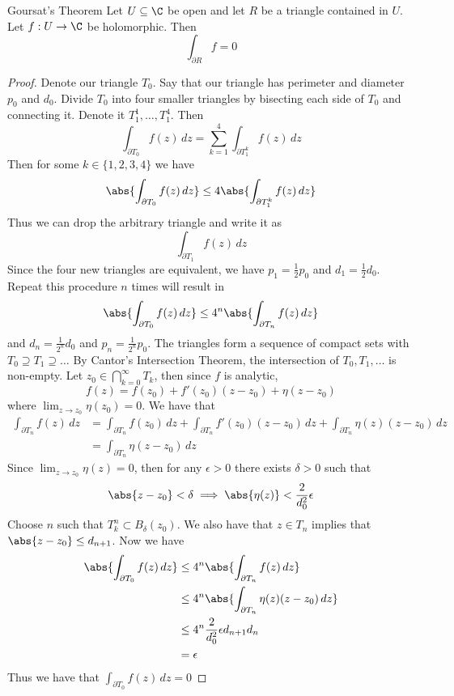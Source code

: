\documentclass[a4paper]{article}
\begin{document}
\begin{thm}{Goursat's Theorem}{} Let $U\subseteq\C$ be open and let $R$ be a triangle contained in $U$. Let $f:U\to\C$ be holomorphic. Then $$\int_{\partial R}f=0$$ \tcbline
\begin{proof} Denote our triangle $T_0$. Say that our triangle has perimeter and diameter $p_0$ and $d_0$. Divide $T_0$ into four smaller triangles by bisecting each side of $T_0$ and connecting it. Denote it $T_1^1,\dots,T_1^4$. Then $$\int_{\partial T_0}f(z)\,dz=\sum_{k=1}^4\int_{\partial T_1^k}f(z)\,dz$$ Then for some $k\in\{1,2,3,4\}$ we have $$\abs{\int_{\partial T_0}f(z)\,dz}\leq 4\abs{\int_{\partial T_1^k}f(z)\,dz}$$ Thus we can drop the arbitrary triangle and write it as $$\int_{\partial T_1}f(z)\,dz$$ Since the four new triangles are equivalent, we have $p_1=\frac{1}{2}p_0$ and $d_1=\frac{1}{2}d_0$. Repeat this procedure $n$ times will result in $$\abs{\int_{\partial T_0}f(z)\,dz}\leq 4^n\abs{\int_{\partial T_n}f(z)\,dz}$$ and $d_n=\frac{1}{2^n}d_0$ and $p_n=\frac{1}{2^n}p_0$. The triangles form a sequence of compact sets with $T_0\supseteq T_1\supseteq\dots$ By Cantor's Intersection Theorem, the intersection of $T_0,T_1,\dots$ is non-empty. Let $z_0\in\bigcap_{k=0}^\infty T_k$, then since $f$ is analytic, $$f(z)=f(z_0)+f'(z_0)(z-z_0)+\eta(z-z_0)$$ where $\lim_{z\to z_0}\eta(z_0)=0$. We have that
\begin{align*}
\int_{\partial T_n}f(z)\,dz&=\int_{\partial T_n}f(z_0)\,dz+\int_{\partial T_n}f'(z_0)(z-z_0)\,dz+\int_{\partial T_n}\eta(z)(z-z_0)\,dz\\
&=\int_{\partial T_n}\eta(z-z_0)\,dz
\end{align*} Since $\lim_{z\to z_0}\eta(z)=0$, then for any $\epsilon>0$ there exists $\delta>0$ such that $$\abs{z-z_0}<\delta\implies\abs{\eta(z)}<\frac{2}{d_0^2}\epsilon$$ Choose $n$ such that $T_k^n\subset B_\delta(z_0)$. We also have that $z\in T_n$ implies that $\abs{z-z_0}\leq d_{n+1}$. Now we have
\begin{align*}
\abs{\int_{\partial T_0}f(z)\,dz}&\leq4^n\abs{\int_{\partial T_n}f(z)\,dz}\\
&\leq4^n\abs{\int_{\partial T_n}\eta(z)(z-z_0)\,dz}\\
&\leq4^n\frac{2}{d_0^2}\epsilon d_{n+1}d_n\\
&=\epsilon
\end{align*} Thus we have that $\int_{\partial T_0}f(z)\,dz=0$
\end{proof}
\end{thm}
\end{document}
